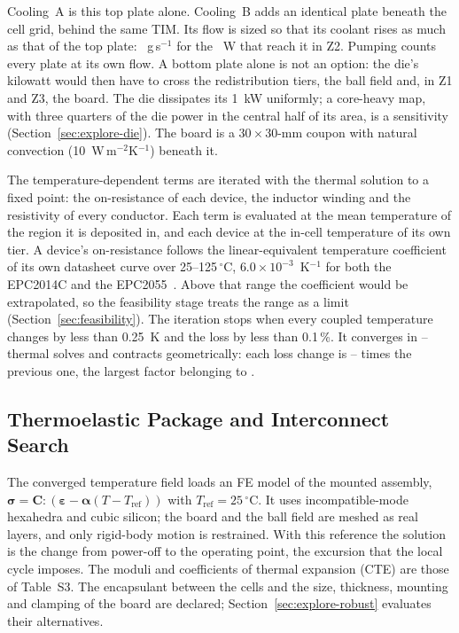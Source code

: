 Cooling~A is this top plate alone. Cooling~B adds an identical plate beneath the cell grid,
behind the same TIM. Its flow is sized so that its coolant rises as much as that of the top plate:
\MthBotFlowZtwo~g\,s$^{-1}$ for the \QbotBZtwo~W that reach it in Z2. Pumping counts every plate at
its own flow. A bottom plate alone is not an option: the die's kilowatt would then have to cross
the redistribution tiers, the ball field and, in Z1 and Z3, the board. The die dissipates its 1~kW uniformly; a core-heavy map, with three
quarters of the die power in the central half of its area, is a sensitivity
(Section~\ref{sec:explore-die}). The board is a $30\times30$-mm coupon with natural
convection (10~W\,m$^{-2}$K$^{-1}$) beneath it.

The temperature-dependent terms are iterated with the thermal solution to a fixed point: the
on-resistance of each device, the inductor winding and the resistivity of every conductor. Each
term is evaluated at the mean temperature of the region it is deposited in, and each device at
the in-cell temperature of its own tier. A device's on-resistance follows the linear-equivalent
temperature coefficient of its own datasheet curve over 25--125\,$^\circ$C,
$6.0\times10^{-3}$~K$^{-1}$ for both the EPC2014C and the EPC2055~\cite{EPC2014C_DS2021,
FrEPC2055DS2025}. Above that range the coefficient would be extrapolated, so the feasibility stage
treats the range as a limit (Section~\ref{sec:feasibility}). The iteration stops when every coupled temperature changes by less than 0.25~K and the loss by less
than 0.1\,\%. It converges in \MthEtItersLo--\MthEtItersHi{} thermal solves and contracts
geometrically: each loss change is \MthEtContractLo--\MthEtContractHi{} times the previous one, the
largest factor belonging to \MthEtContractCase.

\subsection{Thermoelastic Package and Interconnect Search}\label{sec:mechanics}
The converged temperature field loads an FE model of the mounted assembly,
$\boldsymbol{\sigma} = \mathbf{C}:(\boldsymbol{\varepsilon}-\boldsymbol{\alpha}(T-T_{\mathrm{ref}}))$
with $T_{\mathrm{ref}} = 25\,^\circ$C. It uses incompatible-mode hexahedra and cubic silicon;
the board and the ball field are meshed as real layers, and only rigid-body motion is
restrained. With this reference the solution is the change from power-off to the operating
point, the excursion that the local cycle imposes. The moduli and coefficients of thermal
expansion (CTE) are those of Table~S3. The encapsulant between the cells and the size, thickness, mounting
and clamping of the board are declared; Section~\ref{sec:explore-robust} evaluates their
alternatives.

